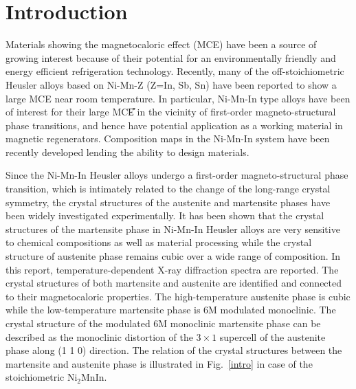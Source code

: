 \documentclass[sort&compress,twocolumn,3p]{elsarticle}
\begin{document}
\maketitle

\section{Introduction}
Materials showing the magnetocaloric effect (MCE) have been a source of growing interest because of their 
potential for an environmentally friendly and energy efficient refrigeration technology.
Recently, many of the off-stoichiometric Heusler alloys based on
Ni-Mn-Z (Z=In, Sb, Sn) have been reported to show a large MCE near room temperature\cite{tishin2003magnetocaloric,doi:10.1063/1.4874935,doi:10.1063/1.1808879,krenke2005inverse,doi:10.1063/1.2187414,:/content/aip/journal/jap/101/5/10.1063/1.2710779,Liu2012514,Bennett201234}.
In particular, Ni-Mn-In type alloys have been of interest for their large MCE͒
in the vicinity of first-order magneto-structural phase transitions, and hence have potential application as a working material in magnetic regenerators\cite{PhysRevB.75.104414,:/content/aip/journal/apl/89/18/10.1063/1.2385147}.
Composition maps in the Ni-Mn-In system have been recently developed lending the ability to design materials\cite{:/content/aip/journal/apl/101/22/10.1063/1.4768235,Chen2016176,:/content/aip/journal/jap/116/20/10.1063/1.4902527}.

Since the Ni-Mn-In Heusler alloys undergo a first-order magneto-structural phase transition, which is intimately related to the change of the long-range crystal symmetry,
the crystal structures of the austenite and martensite phases have been widely investigated experimentally\cite{Yan2015375,PhysRevB.73.174413,HERNANDO2009763,doi:10.1063/1.2827179,doi:10.1063/1.3574088,doi:10.1063/1.1808879,PhysRevB.75.104414,doi:10.1063/1.2187414,doi:10.1063/1.2913162,LIU20094911,KenichiAbematsu2014M2013372}.
It has been shown that the crystal structures of the martensite phase in Ni-Mn-In Heusler alloys are very sensitive to chemical compositions as well as material processing
while the crystal structure of austenite phase remains cubic over a wide range of composition.
In this report, temperature-dependent X-ray diffraction spectra are reported.
The crystal structures of both martensite and austenite are identified and connected to their magnetocaloric properties.
The high-temperature austenite phase is cubic while the low-temperature martensite phase is 6M modulated monoclinic.
The crystal structure of the modulated 6M monoclinic martensite phase can be described as the monoclinic distortion of the $3\times1$ supercell of the austenite phase along (1 1 0) direction.
The relation of the crystal structures between the martensite and austenite phase is illustrated in Fig.~\ref{intro} in case of the stoichiometric Ni$_2$MnIn.
\end{document}
